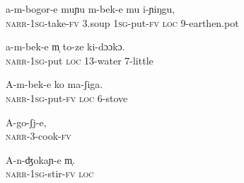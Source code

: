 \documentclass[output=paper]{LSP/langsci}
\begin{document}
 \begin{exe}
 \label{Saapp19}
\gll a-m-bogor-e muɲu m-bek-e mu i-ɲiŋgu,\\
\textsc{narr}-\textsc{1sg}-take-\textsc{fv}  \textsc{3}.soup    \textsc{1sg}-put-\textsc{fv}  \textsc{loc}  \textsc{9}-earthen.pot\\
\glt {}
\end{exe}

 \begin{exe}
 \label{Saapp20}
\gll a-m-bek-e m̩ to-ze ki-dɔɔkɔ.\\
\textsc{narr}-\textsc{1sg}-put  \textsc{loc}  \textsc{13}-water  \textsc{7}-little\\
\glt {}
\end{exe}

 \begin{exe}
 \label{Saapp21}
\gll A-m-bek-e ko ma-ʃiga.\\
\textsc{narr}-\textsc{1sg}-put-\textsc{fv}  \textsc{loc}  \textsc{6}-stove\\
\glt {}
\end{exe}

 \begin{exe}
 \label{Saapp22}
\gll A-go-ʃj-e,\\
\textsc{narr}-\textsc{3}-cook-\textsc{fv}\\
\glt {}
\end{exe}

 \begin{exe}
 \label{Saapp23}
\gll A-n-ʤokaɲ-e m̩.\\
\textsc{narr}-\textsc{1sg}-stir-\textsc{fv}  \textsc{loc}\\
\glt {}
\end{exe}

\pagebreak
\end{document}
